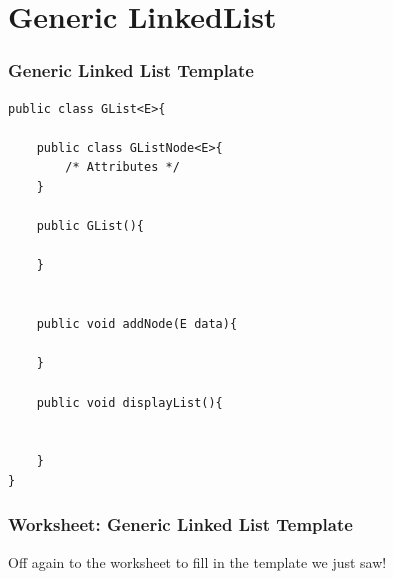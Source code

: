 \documentclass{beamer}
\begin{document}
\section{Generic LinkedList}
\begin{frame}[fragile]
    \frametitle{Generic Linked List Template}
    \vfill
    \begin{lstlisting}[frame=trBL, basicstyle=\tiny]
public class GList<E>{

    public class GListNode<E>{
        /* Attributes */
    }
    
    public GList(){
    
    }
    
    
    public void addNode(E data){

    }
    
    public void displayList(){
    

    }
} 
    \end{lstlisting}
    \vfill
\end{frame}

\begin{frame}
    \frametitle{Worksheet: Generic Linked List Template}
    \vfill
    \centering
    Off again to the worksheet to fill in the template we just saw!
    \vfill
\end{frame}
\end{document}
